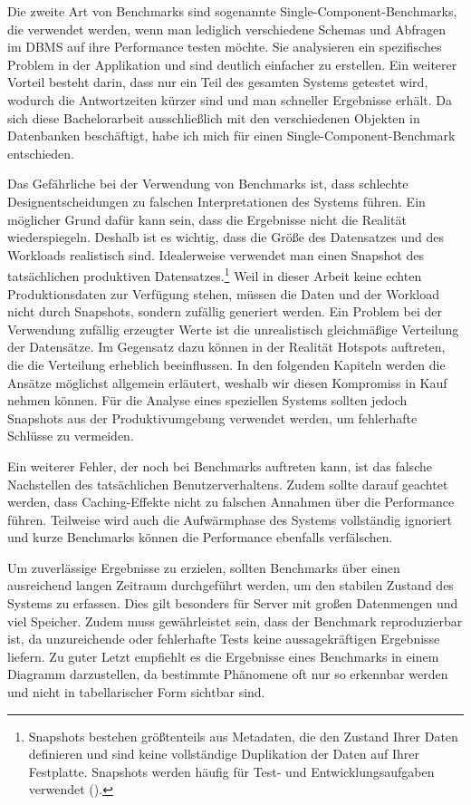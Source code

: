 Die zweite Art von Benchmarks sind sogenannte Single-Component-Benchmarks, die verwendet werden, wenn man lediglich verschiedene Schemas und Abfragen im DBMS auf ihre Performance testen möchte.
Sie analysieren ein spezifisches Problem in der Applikation und sind deutlich einfacher zu erstellen.
Ein weiterer Vorteil besteht darin, dass nur ein Teil des gesamten Systems getestet wird, wodurch die Antwortzeiten kürzer sind und man schneller Ergebnisse erhält.
Da sich diese Bachelorarbeit ausschließlich mit den verschiedenen Objekten in Datenbanken beschäftigt, habe ich mich für einen Single-Component-Benchmark entschieden.

Das Gefährliche bei der Verwendung von Benchmarks ist, dass schlechte Designentscheidungen zu falschen Interpretationen des Systems führen.
Ein möglicher Grund dafür kann sein, dass die Ergebnisse nicht die Realität wiederspiegeln.
Deshalb ist es wichtig, dass die Größe des Datensatzes und des Workloads realistisch sind.
Idealerweise verwendet man einen Snapshot des tatsächlichen produktiven Datensatzes.\footnote{Snapshots bestehen größtenteils aus Metadaten, die den Zustand Ihrer Daten definieren und sind keine vollständige Duplikation der Daten auf Ihrer Festplatte. Snapshots werden häufig für Test- und Entwicklungsaufgaben verwendet (\cite{snapshot}).}
Weil in dieser Arbeit keine echten Produktionsdaten zur Verfügung stehen, müssen die Daten und der Workload nicht durch Snapshots, sondern zufällig generiert werden.
Ein Problem bei der Verwendung zufällig erzeugter Werte ist die unrealistisch gleichmäßige Verteilung der Datensätze.
Im Gegensatz dazu können in der Realität Hotspots auftreten, die die Verteilung erheblich beeinflussen.
In den folgenden Kapiteln werden die Ansätze möglichst allgemein erläutert, weshalb wir diesen Kompromiss in Kauf nehmen können.
Für die Analyse eines speziellen Systems sollten jedoch Snapshots aus der Produktivumgebung verwendet werden, um fehlerhafte Schlüsse zu vermeiden.

Ein weiterer Fehler, der noch bei Benchmarks auftreten kann, ist das falsche Nachstellen des tatsächlichen Benutzerverhaltens.
Zudem sollte darauf geachtet werden, dass Caching-Effekte nicht zu falschen Annahmen über die Performance führen.
Teilweise wird auch die Aufwärmphase des Systems vollständig ignoriert und kurze Benchmarks können die Performance ebenfalls verfälschen.

Um zuverlässige Ergebnisse zu erzielen, sollten Benchmarks über einen ausreichend langen Zeitraum durchgeführt werden, um den stabilen Zustand des Systems zu erfassen.
Dies gilt besonders für Server mit großen Datenmengen und viel Speicher.
Zudem muss gewährleistet sein, dass der Benchmark reproduzierbar ist, da unzureichende oder fehlerhafte Tests keine aussagekräftigen Ergebnisse liefern.
Zu guter Letzt empfiehlt es die Ergebnisse eines Benchmarks in einem Diagramm darzustellen, da bestimmte Phänomene oft nur so erkennbar werden und nicht in tabellarischer Form sichtbar sind.

